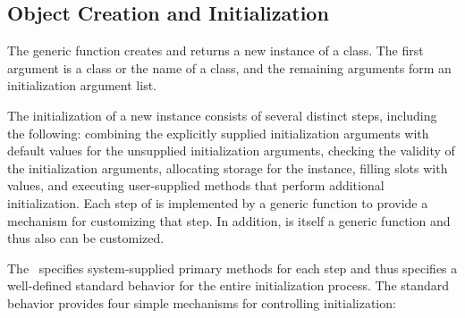 \subsection{Object Creation and Initialization}
\label{Object-Creation-and-Initialization-SECTION}

The generic function  creates and returns a new
instance of a class.  The first argument is a class or the name of a
class, and the remaining arguments form an {\bit initialization argument\/}
list.  

The initialization of a new instance consists of several distinct
steps, including the following: combining the explicitly supplied
initialization arguments with default values for the unsupplied
initialization arguments, checking the validity of the initialization
arguments, allocating storage for the instance, filling slots with
values, and executing user-supplied methods that perform additional
initialization.  Each step of  is implemented by a
generic function to provide a mechanism for customizing that step.  In
addition,  is itself a generic function and thus
also can be customized.

The \OS\ specifies system-supplied primary methods for each step and
thus specifies a well-defined standard behavior for the entire
initialization process.  The standard behavior provides four simple
mechanisms for controlling initialization:

